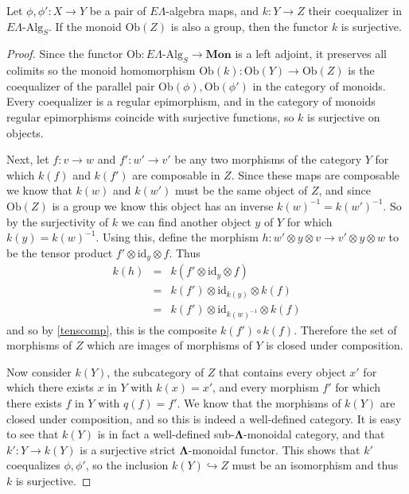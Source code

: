 \documentclass{amsbook} %
\newcommand{\mb}{\mathbf}
\newcommand{\ML}{\mathbf{\Lambda}}
\newcommand{\mon}{\ensuremath{\mb{Mon}}}
\numberwithin{section}{chapter}
\begin{document}
\begin{prop}\label{coeqsurj} Let $\phi, \phi' : X \to Y$ be a pair of $E\Lambda$-algebra maps, and $k: Y \to Z$ their coequalizer in $E\Lambda\mbox{-}\mathrm{Alg}_S$. If the monoid $\mathrm{Ob}(Z)$ is also a group, then the functor $k$ is surjective.
\end{prop}
\begin{proof}
Since the functor $\mathrm{Ob} : E\Lambda\mbox{-}\mathrm{Alg}_S \to \mon$ is a left adjoint, it preserves all colimits so the monoid homomorphism $\mathrm{Ob}(k): \mathrm{Ob}(Y) \to \mathrm{Ob}(Z)$ is the coequalizer of the parallel pair $\mathrm{Ob}(\phi), \mathrm{Ob}(\phi')$ in the category of monoids. Every coequalizer is a regular epimorphism, and in the category of monoids regular epimorphisms coincide with  surjective functions, so $k$ is surjective on objects.


Next, let $f: v \to w$ and $f' : w' \to v'$ be any two morphisms of the category $Y$ for which $k(f)$ and $k(f')$ are composable in $Z$. Since these maps are composable we know that $k(w)$ and $k(w')$ must be the same object of $Z$, and since $\mathrm{Ob}(Z)$ is a group we know this object has an inverse $k(w)^{-1} = k(w')^{-1}$. So by the surjectivity of $k$ we can find another object $y$ of $Y$ for which $k(y) = k(w)^{-1}$. Using this, define the morphism $h: w' \otimes y \otimes v \to v' \otimes y \otimes w$ to be the tensor product $f' \otimes \mathrm{id}_y \otimes f$. Thus
\[ \begin{array}{rll}
		k(h) & = & k(f' \otimes \mathrm{id}_y \otimes f) \\
		& = & k(f') \otimes \mathrm{id}_{k(y)} \otimes k(f) \\
		& = & k(f') \otimes \mathrm{id}_{k(w)^{-1}} \otimes k(f)
		\end{array}
\]
and so by \cref{tenscomp}, this is the composite $k(f') \circ k(f)$. Therefore the set of morphisms of $Z$ which are images of morphisms of $Y$ is closed under composition. 

Now consider $k(Y)$, the subcategory of $Z$ that contains every object $x'$ for which there exists $x$ in $Y$ with $k(x) = x'$, and every morphism $f'$ for which there exists $f$ in $Y$ with $q(f) = f'$. We know that the morphisms of $k(Y)$ are closed under composition, and so this is indeed a well-defined category. It is easy to see that $k(Y)$ is in fact a well-defined sub-$\ML$-monoidal category, and that $k': Y \to k(Y)$ is a surjective strict $\ML$-monoidal functor. This shows that $k'$ coequalizes $\phi, \phi'$, so the inclusion $k(Y) \hookrightarrow Z$ must be an isomorphism and thus $k$ is surjective.
\end{proof}
\end{document}
